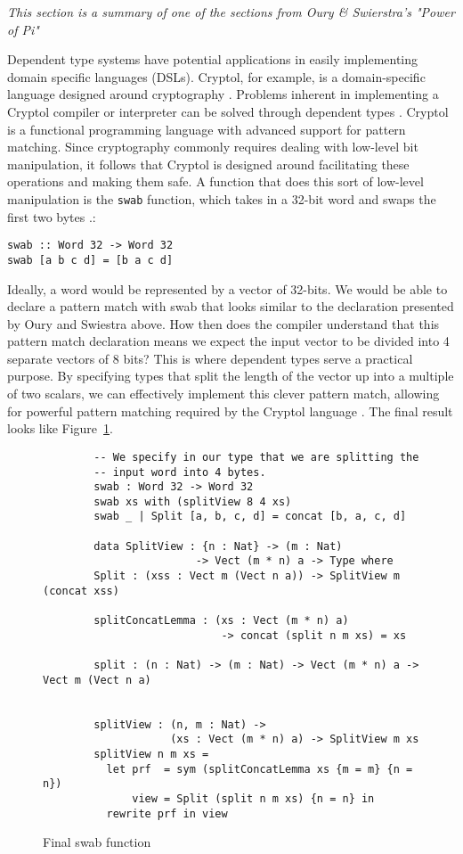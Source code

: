 \textit{This section is a summary of one of the sections from Oury & Swierstra's
"Power of Pi" \cite{power_of_pi}}

Dependent type systems have potential applications in easily implementing domain
specific languages (DSLs). Cryptol, for example, is a domain-specific language
designed around cryptography \cite{cryptol_manual}. Problems inherent in
implementing a Cryptol compiler or interpreter can be solved through dependent
types \cite{power_of_pi}. Cryptol is a functional programming language with
advanced support for pattern matching. Since cryptography commonly requires
dealing with low-level bit manipulation, it follows that Cryptol is designed
around facilitating these operations and making them safe. A function that does
this sort of low-level manipulation is the \texttt{swab} function, which takes
in a 32-bit word and swaps the first two bytes \cite{cryptol_manual}.: 

\texttt{swab :: Word 32 -> Word 32}\\
\texttt{swab [a b c d] = [b a c d]}

Ideally, a word would be represented by a vector of 32-bits. We would be able to
declare a pattern match with swab that looks similar to the declaration
presented by Oury and Swiestra above. How then does the compiler understand that
this pattern match declaration means we expect the input vector to be divided
into 4 separate vectors of 8 bits? This is where dependent types serve a
practical purpose. By specifying types that split the length of the vector up
into a multiple of two scalars, we can effectively implement this clever pattern
match, allowing for powerful pattern matching required by the Cryptol language
\cite{power_of_pi}. The final result looks like Figure~\ref{swab}. 

\begin{figure}[ht!]
    \caption{Final swab function \protect\cite{power_of_pi}}
    \label{swab}
    \begin{lstlisting}
        -- We specify in our type that we are splitting the
        -- input word into 4 bytes. 
        swab : Word 32 -> Word 32
        swab xs with (splitView 8 4 xs)
        swab _ | Split [a, b, c, d] = concat [b, a, c, d]

        data SplitView : {n : Nat} -> (m : Nat) 
                        -> Vect (m * n) a -> Type where
        Split : (xss : Vect m (Vect n a)) -> SplitView m (concat xss)
        
        splitConcatLemma : (xs : Vect (m * n) a) 
                            -> concat (split n m xs) = xs
        
        split : (n : Nat) -> (m : Nat) -> Vect (m * n) a -> Vect m (Vect n a)


        splitView : (n, m : Nat) -> 
                    (xs : Vect (m * n) a) -> SplitView m xs
        splitView n m xs =
          let prf  = sym (splitConcatLemma xs {m = m} {n = n})
              view = Split (split n m xs) {n = n} in
          rewrite prf in view
    \end{lstlisting}
\end{figure}

